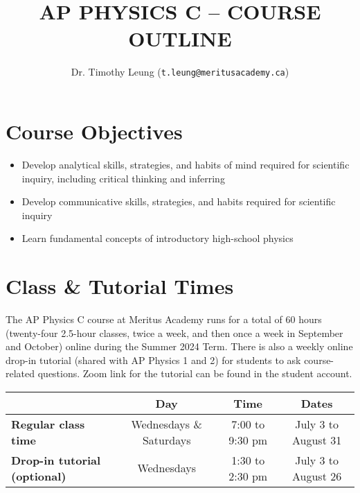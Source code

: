 \documentclass{../../oss-handout}
\title{AP PHYSICS C -- COURSE OUTLINE}
\author{Dr. Timothy Leung (\texttt{t.leung@meritusacademy.ca})}
\begin{document}
\thispagestyle{title}
\gentitle


\section{Course Objectives}
\begin{itemize}[nosep]
\item Develop analytical skills, strategies, and habits of mind required for
  scientific inquiry, including critical thinking and inferring
\item Develop communicative skills, strategies, and habits required for
  scientific inquiry
\item Learn fundamental concepts of introductory high-school physics
\end{itemize}






\section{Class \& Tutorial Times}
The AP Physics C course at Meritus Academy runs for a total of 60 hours
(twenty-four 2.5-hour classes, twice a week, and then once a week in September
and October) online during the Summer 2024 Term. There is also a weekly online
drop-in tutorial (shared with AP Physics 1 and 2) for students to ask
course-related questions. Zoom link for the tutorial can be found in the
student account.

\bgroup
\def\arraystretch{1.25}
\begin{tabular}{|p{1.9in}|c|c|c|}
  \rowcolor{lightgray}
  \hline
  & \textbf{Day} & \textbf{Time} & \textbf{Dates} \\
  \hline\hline
  
  \textbf{Regular class time} &
  \hspace{.1in}Wednesdays \& Saturdays\hspace{.1in} &
  \hspace{.1in}7:00 to 9:30 pm\hspace{.1in} &
  \hspace{.1in}July 3 to August 31\hspace{.1in} \\
  \hline
  
  \textbf{Drop-in tutorial (optional)} &
  Wednesdays & 1:30 to 2:30 pm &  July 3 to August 26 \\
  \hline
\end{tabular}
\egroup
\end{document}
